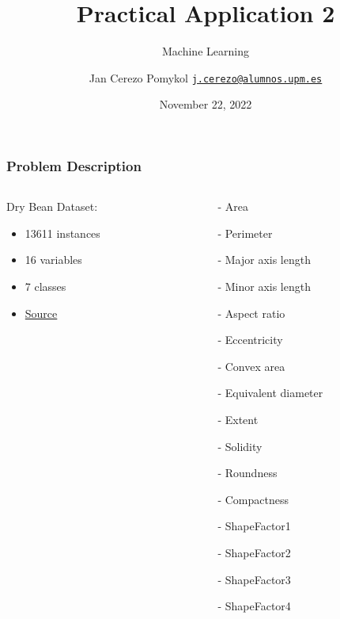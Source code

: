 \documentclass{beamer}
\title[Practical Application 2]
	{Practical Application 2}
\subtitle{Machine Learning}
\author[Cerezo Pomykol, Jan]
	{Jan Cerezo Pomykol\newline
	\href{mailto:j.cerezo@alumnos.upm.es}{\small\texttt{j.cerezo@alumnos.upm.es}}}
\institute[Universidad Politécnica de Madrid]
	{Universidad Politécnica de Madrid\newline
	 ETSIINF}
\date{November 22, 2022}
\begin{document}
\maketitle

\begin{frame}
\frametitle{Problem Description}
\begin{columns}
\begin{column}{0.5\textwidth}
Dry Bean Dataset:
\begin{itemize}
\item 13611 instances
\item 16 variables
\item 7 classes
\item \href{https://archive.ics.uci.edu/ml/datasets/Dry+Bean+Dataset\#}{\small\color{blue}Source}
\end{itemize}
\centering
{}
\end{column}
\begin{column}{0.25\textwidth}
\begin{tiny}
\begin{itemize}
\item[-] Area
\item[-] Perimeter
\item[-] Major axis length
\item[-] Minor axis length
\item[-] Aspect ratio
\item[-] Eccentricity
\item[-] Convex area
\item[-] Equivalent diameter
\item[-] Extent
\item[-] Solidity
\item[-] Roundness
\item[-] Compactness
\item[-] ShapeFactor1
\item[-] ShapeFactor2
\item[-] ShapeFactor3
\item[-] ShapeFactor4
\end{itemize}
\end{tiny}
\end{column}


\end{columns}
\end{frame}
\end{document}
